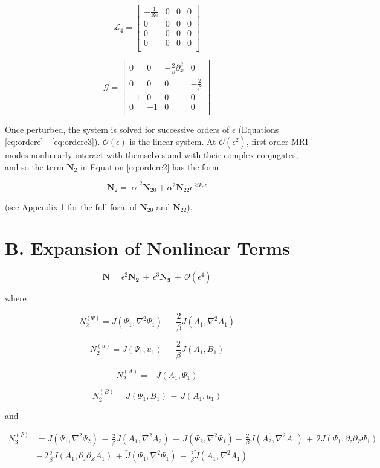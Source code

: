 \documentclass{emulateapj}
\newcommand{\beq}{\begin{equation}}
\newcommand{\eeq}{\end{equation}}
\newcommand\reye{\mathrm{Re}}
\begin{document}
\beq
\mathcal{L}_4 = \left[\begin{matrix}
-\frac{1}{\reye} & 0 & 0 & 0 \\
0 & 0 & 0 & 0 \\
0 & 0 & 0 & 0 \\
0 & 0 & 0 & 0 \\ \end{matrix}\right] 
\eeq

\beq
\mathcal{G} = \left[\begin{matrix}
0 & 0 & -\frac{2}{\beta}\partial_x^2 & 0 \\
0 & 0 & 0 & -\frac{2}{\beta} \\
-1 & 0 & 0 & 0 \\
0 & -1 & 0 & 0 \\ \end{matrix} \right]
\eeq

Once perturbed, the system is solved for successive orders of $\epsilon$ (Equations \ref{eq:ordere} - \ref{eq:ordere3}). $\mathcal{O}(\epsilon)$ is the linear system. At $\mathcal{O}(\epsilon^2)$, first-order MRI modes nonlinearly interact with themselves and with their complex conjugates, and so the term $\mathbf{N}_2$ in Equation \ref{eq:ordere2} has the form

\beq
\mathbf{N}_2 = |\alpha|^2 \mathbf{N}_{20} + \alpha^2 \mathbf{N}_{22} e^{2 i k_c z}
\eeq

(see Appendix \ref{app:nonlinear_terms} for the full form of $\mathbf{N}_{20}$ and $\mathbf{N}_{22}$). 

\section{B. Expansion of Nonlinear Terms}\label{app:nonlinear_terms}
\beq
\mathbf{N} = \epsilon^2\mathbf{N_2} \, + \, \epsilon^3\mathbf{N_3} \, + \, \mathcal{O}(\epsilon^4)
\eeq

where

\beq
N_2^{(\Psi)} = J(\Psi_1, \nabla^2 \Psi_1) \,-\, \frac{2}{\beta}J(A_1, \nabla^2 A_1) 
\eeq

\beq
N_2^{(u)} = J(\Psi_1, u_1) \, - \, \frac{2}{\beta} J(A_1, B_1) 
\eeq

\beq
N_2^{(A)} = - J(A_1, \Psi_1) 
\eeq

\beq
N_2^{(B)} =  J(\Psi_1, B_1) \, - \, J(A_1, u_1)
\eeq

and

\beq
\begin{split}
N_3^{(\Psi)} & = J(\Psi_1, \nabla^2\Psi_2) \, - \, \frac{2}{\beta}J(A_1, \nabla^2 A_2) \,+\, J(\Psi_2, \nabla^2\Psi_1) - \, \frac{2}{\beta}J(A_2, \nabla^2 A_1) \,+\, 2 J(\Psi_1, \partial_z\partial_Z \Psi_1) \, \\
& - \, 2 \frac{2}{\beta}J(A_1, \partial_z\partial_Z A_1) \,+\, \widetilde{J}(\Psi_1, \nabla^2 \Psi_1) \, - \,  \frac{2}{\beta}\widetilde{J}(A_1, \nabla^2 A_1)\\
\end{split}
\eeq
\end{document}
